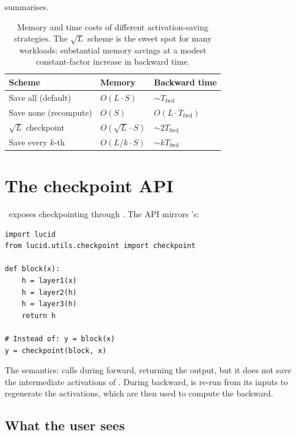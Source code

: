  summarises.

\begin{table}[t]
\centering
\small
\begin{tabular}{lll}
\toprule
Scheme & Memory & Backward time \\
\midrule
Save all (default)     & $O(L \cdot S)$        & $\sim T_{\text{fwd}}$ \\
Save none (recompute)  & $O(S)$                & $O(L \cdot T_{\text{fwd}})$ \\
$\sqrt{L}$ checkpoint  & $O(\sqrt{L} \cdot S)$ & $\sim 2 T_{\text{fwd}}$ \\
Save every $k$-th      & $O(L/k \cdot S)$      & $\sim k T_{\text{fwd}}$ \\
\bottomrule
\end{tabular}
\caption[Checkpointing schemes.]{Memory and time costs of
different activation-saving strategies. The $\sqrt{L}$ scheme is
the sweet spot for many workloads: substantial memory savings at a
modest constant-factor increase in backward time.}
\label{tab:gradient_checkpointing:scheme}
\end{table}

\section{The checkpoint API}
\label{sec:gradient_checkpointing:api}

\Lucid\ exposes checkpointing through .
The API mirrors 's:

\begin{lstlisting}[style=lucid,language=LucidPython]
import lucid
from lucid.utils.checkpoint import checkpoint

def block(x):
    h = layer1(x)
    h = layer2(h)
    h = layer3(h)
    return h

# Instead of: y = block(x)
y = checkpoint(block, x)
\end{lstlisting}

The semantics:  calls 
during forward, returning the output, but it does not save the
intermediate activations of . During backward, 
is re-run from its inputs to regenerate the activations, which
are then used to compute the backward.

\subsection{What the user sees}
\label{ssec:gradient_checkpointing:user_view}

